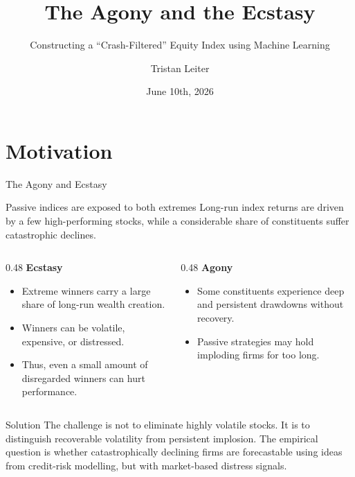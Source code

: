 \documentclass[10pt]{beamer}\usepackage[]{graphicx}\usepackage[table]{xcolor}
\title[The Agony and the Ecstasy]{The Agony and the Ecstasy}
\subtitle{Constructing a ``Crash-Filtered'' Equity Index using Machine Learning}
\author{Tristan Leiter}
\institute[WU]{Vienna University of Business and Economics \\
        \medskip
        \scriptsize Supervisor: Prof. Kurt Hornik}
\date{June 10th, 2026}
\newcommand{\sourcefoot}[1]{\vspace{0.25em}{\tiny \textit{Source:} #1}}
\begin{document}
\begin{frame}
  \titlepage
\end{frame}


\section{Motivation}
\begin{frame}{The Agony and Ecstasy}
\small
\begin{alertblock}{Passive indices are exposed to both extremes}
Long-run index returns are driven by a few high-performing stocks, while a considerable share of constituents suffer catastrophic declines.
\end{alertblock}

\vspace{0.35em}
\begin{columns}[t]
\begin{column}{0.48\textwidth}
\textbf{Ecstasy}
\begin{itemize}
  \item Extreme winners carry a large share of long-run wealth creation.
  \item Winners can be volatile, expensive, or distressed.
  \item Thus, even a small amount of disregarded winners can hurt performance.
\end{itemize}
\end{column}
\begin{column}{0.48\textwidth}
\textbf{Agony}
\begin{itemize}
  \item Some constituents experience deep and persistent drawdowns without recovery.
  \item Passive strategies may hold imploding firms for too long.
\end{itemize}
\end{column}
\end{columns}

\vspace{0.35em}
\begin{block}{Solution}
\scriptsize
The challenge is not to eliminate highly volatile stocks. It is to distinguish recoverable volatility from persistent implosion. The empirical question is whether catastrophically declining firms are forecastable using ideas from credit-risk modelling, but with market-based distress signals.
\end{block}
\end{frame}
\end{document}
